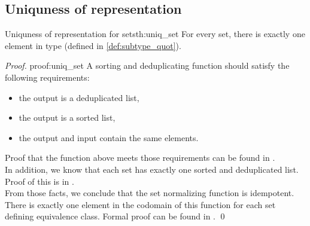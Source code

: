 \subsection{Uniquness of representation}
\begin{theo}{Uniquness of representation for sets}{th:uniq_set}
For every set, there is exactly one element in  type (defined in \ref{def:subtype_quot}). 
\end{theo}
\begin{proof}{}{proof:uniq_set}
A sorting and deduplicating function should satisfy the following requirements:
\begin{itemize}
    \itemsep 0em 
    \item the output is a deduplicated list,
    \item the output is a sorted list,
    \item the output and input contain the same elements.
\end{itemize}
Proof that the function above meets those requirements can be found in .\\
In addition, we know that each set has exactly one sorted and deduplicated list. Proof of this is in  .\\
From those facts, we conclude that the set normalizing function is idempotent. There is exactly one element in the codomain of this function for each set defining equivalence class. Formal proof can be found in . \qed
\end{proof}